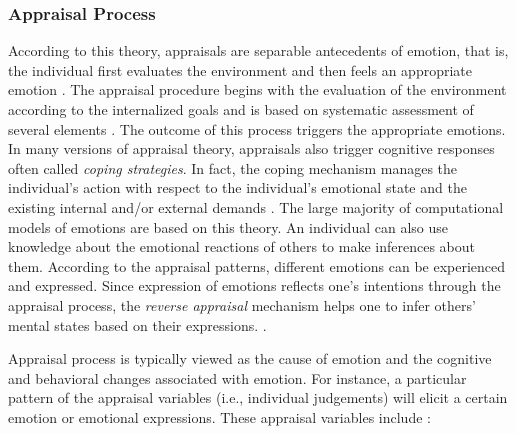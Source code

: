 \documentclass[11pt]{article}
\begin{document}
\subsubsection{Appraisal Process}
\label{sec:appraisal-process}

According to this theory, appraisals are separable antecedents of emotion, that
is, the individual first evaluates the environment and then feels an appropriate
emotion \cite{scherer:appraisal-processes}. The appraisal procedure begins with
the evaluation of the environment according to the internalized goals and is
based on systematic assessment of several elements
\cite{scherer:sequential-appraisal-process}. The outcome of this process
triggers the appropriate emotions. In many versions of appraisal theory,
appraisals also trigger cognitive responses often called \textit{coping
strategies}. In fact, the coping mechanism manages the individual's action with
respect to the individual's emotional state and the existing internal and/or
external demands \cite{folkman:coping-pitfalls-promise}. The large majority of
computational models of emotions are based on this theory. An individual can
also use knowledge about the emotional reactions of others to make inferences
about them. According to the appraisal patterns, different emotions can be
experienced and expressed. Since expression of emotions reflects one's
intentions through the appraisal process, the \textit{reverse appraisal}
mechanism helps one to infer others' mental states based on their expressions.
\cite{gratch:reverse-appraisal, hareli:emotional-reaction-perception}.

Appraisal process is typically viewed as the cause of emotion and the cognitive
and behavioral changes associated with emotion. For instance, a particular
pattern of the appraisal variables (i.e., individual judgements) will elicit a
certain emotion or emotional expressions. These appraisal variables include
\cite{marsella:ema-process-model}:\\
\end{document}
